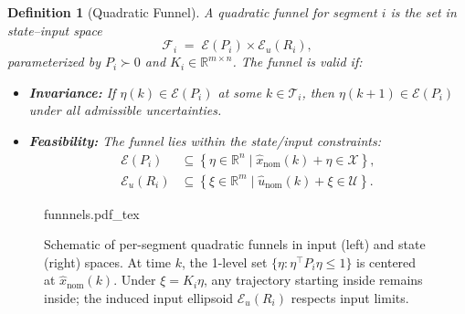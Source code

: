 \documentclass[letterpaper, 10 pt, conference]{ieeeconf}
\newcommand{\R}{\mathbb{R}}
\newtheorem{definition}{Definition}
\begin{document}
\begin{definition}[Quadratic Funnel]
A quadratic funnel for segment $i$ is the set in state–input space
\[
\mathcal{F}_i \;=\; \mathcal{E}(P_i) \times \mathcal{E}_u(R_i),
\]
parameterized by $P_i \succ 0$ and $K_i \in \R^{m \times n}$. The funnel is valid if:
\begin{itemize}
    \item \textbf{Invariance:} If $\eta(k) \in \mathcal{E}(P_i)$ at some $k \in \mathcal{T}_i$, then $\eta(k{+}1) \in \mathcal{E}(P_i)$ under all admissible uncertainties.
    \item \textbf{Feasibility:} The funnel lies within the state/input constraints:
    \begin{align*}
        \mathcal{E}(P_i) &\subseteq \left\{ \eta \in \R^n \mid \hat{x}_{\text{nom}}(k) + \eta \in \mathcal{X} \right\}, \\
        \mathcal{E}_u(R_i) &\subseteq \left\{ \xi \in \R^m \mid \hat{u}_{\text{nom}}(k) + \xi \in \mathcal{U} \right\}.
    \end{align*}
\end{itemize}
\end{definition}


\begin{figure}[t]
  \centering
  \def\svgwidth{\columnwidth}
  \begingroup\footnotesize
  {funnnels.pdf_tex}
  \endgroup
  \caption{Schematic of per-segment quadratic funnels in input (left) and state (right) spaces. At time \(k\), the 1-level set \(\{\eta:\eta^\top P_i \eta \le 1\}\) is centered at \(\hat x_{\text{nom}}(k)\). Under \(\xi=K_i\eta\), any trajectory starting inside remains inside; the induced input ellipsoid \(\mathcal{E}_u(R_i)\) respects input limits.}
  \label{fig:funnels}
\end{figure}
\end{document}
